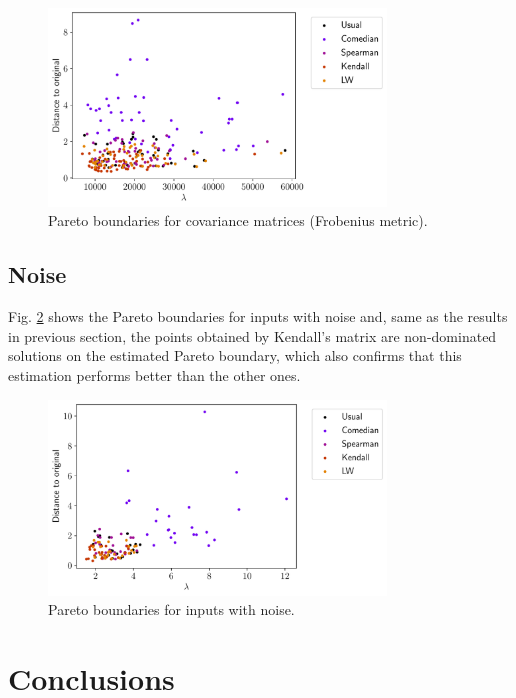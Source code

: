 \documentclass[11pt]{article}
\theoremstyle{definition}
\theoremstyle{remark}
\theoremstyle{remark}
\theoremstyle{remark}
\begin{document}
\begin{figure}[H]
    \centering
    \includegraphics[width=0.8\textwidth]{figs/fro-scatter.pdf}
    \caption{Pareto boundaries for covariance matrices (Frobenius metric).}
    \label{fig:paretocovf}
\end{figure}

\subsection{Noise}
Fig. \ref{fig:paretonoise} shows the Pareto boundaries for inputs with noise and, same as the results in previous section, the points obtained by Kendall's matrix are non-dominated solutions on the estimated Pareto boundary, which also confirms that this estimation performs better than the other ones.

\begin{figure}[H]
    \centering
    \includegraphics[width=0.8\textwidth]{figs/noise-scatter.pdf}
    \caption{Pareto boundaries for inputs with noise.}
    \label{fig:paretonoise}
\end{figure}

\section{Conclusions}\label{sec:conc}
\end{document}
